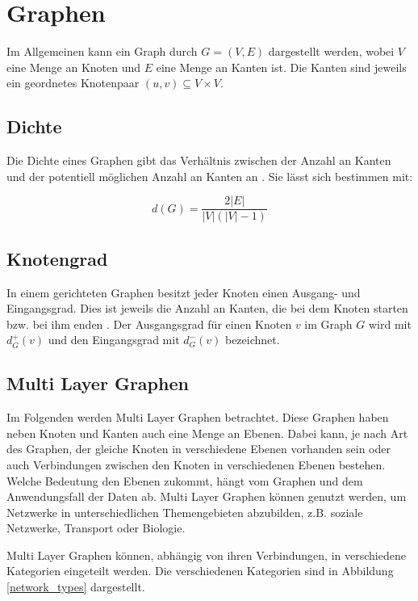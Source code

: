 \section{Graphen}


Im Allgemeinen kann ein Graph durch $G = (V, E)$ dargestellt werden, wobei $V$ eine Menge an Knoten und $E$ eine Menge an Kanten ist. Die Kanten sind jeweils ein geordnetes Knotenpaar $(u, v) \subseteq V \times V$.

\subsection{Dichte}
\label{dichte}

Die Dichte eines Graphen gibt das Verhältnis zwischen der Anzahl an Kanten und der potentiell möglichen Anzahl an Kanten an \cite{diestel2010graphentheorie}.
Sie lässt sich bestimmen mit:

\[ d(G) =  \frac{2|{E}|}{|V|(|V| - 1)}    \]


\subsection{Knotengrad}
\label{knotengrad}

In einem gerichteten Graphen besitzt jeder Knoten einen Ausgang- und Eingangsgrad. Dies ist jeweils die Anzahl an Kanten, die bei dem Knoten starten bzw. bei ihm enden \cite{diestel2010graphentheorie}.
Der Ausgangsgrad für einen Knoten $v$ im Graph $G$ wird mit $d^{+}_{G}(v)$ und den Eingangsgrad mit $d^{-}_{G}(v)$ bezeichnet.



\subsection{Multi Layer Graphen}

Im Folgenden werden Multi Layer Graphen betrachtet. Diese Graphen haben neben Knoten und Kanten auch eine Menge an Ebenen. Dabei kann, je nach Art des Graphen, der gleiche Knoten in verschiedene Ebenen vorhanden sein oder auch Verbindungen zwischen den Knoten in verschiedenen Ebenen bestehen.
Welche Bedeutung den Ebenen zukommt, hängt vom Graphen und dem Anwendungsfall der Daten ab. Multi Layer Graphen können genutzt werden, um Netzwerke in unterschiedlichen Themengebieten abzubilden, z.B. soziale Netzwerke, Transport oder Biologie.

Multi Layer Graphen können, abhängig von ihren Verbindungen, in verschiedene Kategorien eingeteilt werden. Die verschiedenen Kategorien sind in Abbildung \ref{network_types} dargestellt. 

